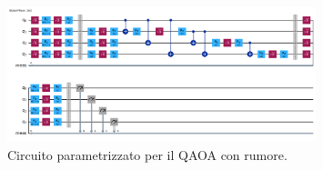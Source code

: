 \begin{figure}[h!]
    \centering
    \includegraphics[width=0.8\textwidth]{images/circuitoVQEnoisy.png}
    \caption{Circuito parametrizzato per il QAOA con rumore. }
    \label{fig:qaoa_noisy_circuit}
\end{figure}





